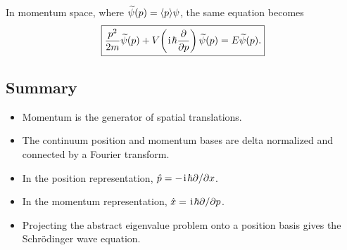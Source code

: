 In momentum space, where $\widetilde{\psi}(p)=\langle{p}\rangle{\psi}$, the same
equation becomes
\begin{equation}
 \boxed{\frac{p^2}{2m}\widetilde{\psi}(p)
 +V\!\left(\hspace{1pt}\mathrm{i}\hspace{1pt}\hbar\frac{\partial}{\partial p}\right)
 \widetilde{\psi}(p)=E\widetilde{\psi}(p).}
\end{equation}

\subsection{Summary}
\begin{itemize}
 \item Momentum is the generator of spatial translations.
 \item The continuum position and momentum bases are delta normalized and
       connected by a Fourier transform.
 \item In the position representation,
       $\hat{p}=-\hspace{1pt}\mathrm{i}\hspace{1pt}\hbar\partial/\partial x$.
 \item In the momentum representation,
       $\hat{x}=\hspace{1pt}\mathrm{i}\hspace{1pt}\hbar\partial/\partial p$.
 \item Projecting the abstract eigenvalue problem onto a position basis gives
       the Schr\"odinger wave equation.
\end{itemize}

